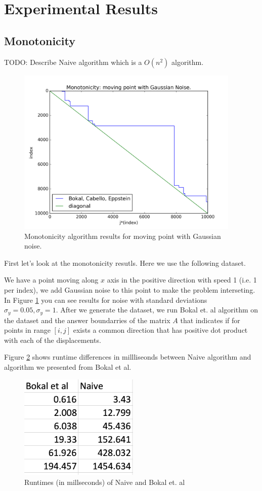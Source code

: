 \documentclass{article}
\begin{document}
\section{Experimental Results}

\subsection{Monotonicity}

TODO: Describe Naive algorithm which is a $O(n^2)$ algorithm.

\begin{figure}[!ht]
  \centering
  \includegraphics[height=8cm]{plots/monotonicity_moving_gaussian}
  \caption{Monotonicity algorithm results for moving point with Gaussian noise.}
  \label{fig:monotonicity_demo}
\end{figure}

First let's look at the monotonicity resutls. Here we use the following dataset.

We have a point moving along $x$ axis in the positive direction with speed 1 (i.e. 1 per index), we add Gaussian noise to this point to make the problem interseting. In Figure \ref{fig:monotonicity_demo} you can see results for noise with standard deviations $\sigma_y = 0.05, \sigma_y = 1$. After we generate the dataset, we run Bokal et. al algorithm on the dataset and the answer boundarries of the matrix $A$ that indicates if for points in range $[i, j]$ exists a common direction that has positive dot product with each of the displacements.

Figure \ref{fig:monotonicity_comparison} shows runtime differences in millliseonds between Naive algorithm and algorithm we presented from Bokal et al.
\begin{figure}[!ht]
  \centering
  \includegraphics[height=5cm]{plots/monotonicity_comparison}
  \caption{Runtimes (in millseconds) of Naive and Bokal et. al}
  \label{fig:monotonicity_comparison}
\end{figure}
\end{document}
